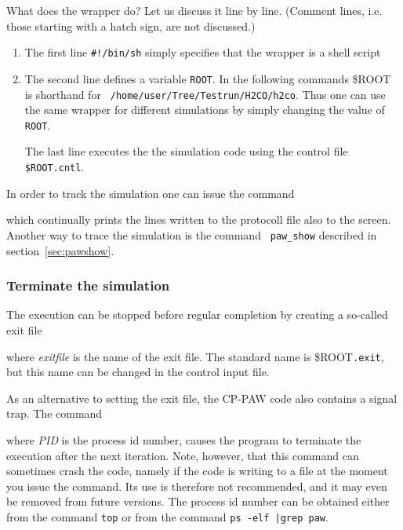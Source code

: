 \documentclass[final,12pt]{article}
\begin{document}
What does the wrapper do? Let us discuss it line by line. (Comment
lines, i.e. those starting with a hatch sign, are not discussed.)
\begin{enumerate}
\item The first line {\tt \#!/bin/sh} simply specifies that the
  wrapper is a shell script
\item The second line defines a variable {\tt ROOT}. In the following
  commands \${ROOT} is shorthand for {\tt
  /home/user/Tree/Testrun/H2CO/h2co}. Thus one can use the same
  wrapper for different simulations by simply changing the value of
  {\tt ROOT}.
\begin{sloppypar}
  The last line executes the the simulation code using the control
  file {\tt \${ROOT}.cntl}. 
\end{sloppypar}
\end{enumerate}

In order to track the simulation one can issue the command

\bigskip{}\bigskip

which continually prints the lines written to the protocoll file also
to the screen. Another way to trace the simulation is the command {\tt
paw\_show} described in section~\ref{sec:pawshow}.


\subsubsection{Terminate the simulation}

The execution can be stopped before regular completion by creating a
so-called exit file

\bigskip{}\bigskip

\noindent where {\it exitfile} is the name of the exit file. 
The standard name is \$ROOT{\tt .exit}, but this name can be changed
in the control input file.

As an alternative to setting the exit file, the CP-PAW code also contains
a signal trap. The command

\bigskip{}\bigskip

\noindent where {\it PID} is the process id number, causes the program
to terminate the execution after the next iteration. Note, however,
that this command can sometimes crash the code, namely if the code is
writing to a file at the moment you issue the command.  Its use is
therefore not recommended, and it may even be removed from future
versions. The process id number can be obtained either from the
command \verb|top| or from the command \verb+ps -elf |grep paw+.
\end{document}
